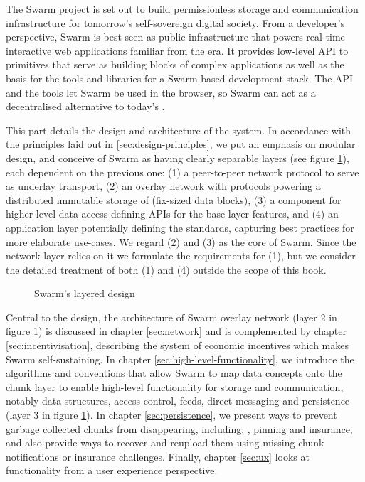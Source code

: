 
\green{}

The Swarm project is set out to build permissionless storage and communication infrastructure for tomorrow's self-sovereign digital society. From a developer's perspective, Swarm is best seen as public infrastructure that powers real-time interactive web applications familiar from the  era. It provides low-level API to primitives that serve as building blocks of complex applications as well as the basis for the tools and libraries for a Swarm-based  development stack. The API and the tools let Swarm be used in the browser, so Swarm can act as a decentralised alternative to today's .

This part details the design and architecture of the system. In accordance with the principles laid out in \ref{sec:design-principles}, we put an emphasis on modular design, and conceive of Swarm as having clearly separable layers (see figure \ref{fig:Swarm-layered-design}), each dependent on the previous one: (1) a peer-to-peer network protocol to serve as underlay transport, (2) an overlay network with protocols powering a distributed immutable storage of  (fix-sized data blocks), (3) a component for higher-level data access defining APIs for the base-layer features, and (4) an application layer potentially defining the standards, capturing best practices for more elaborate use-cases. We regard (2) and (3) as the core of Swarm. Since the network layer relies on it we formulate the requirements for (1), but we consider the detailed treatment of both (1) and (4) outside the scope of this book.


\begin{figure}[htbp]
  \centering
  \caption[Swarm's layered design]{Swarm's layered design}
  \label{fig:Swarm-layered-design}
\end{figure}

Central to the design, the architecture of Swarm overlay network (layer 2 in figure \ref{fig:Swarm-layered-design}) is discussed in chapter \ref{sec:network} and is complemented by chapter \ref{sec:incentivisation}, describing the system of economic incentives which makes Swarm self-sustaining. In chapter \ref{sec:high-level-functionality}, we introduce the algorithms and conventions that allow Swarm to map data concepts onto the chunk layer to enable high-level functionality for storage and communication, notably data structures, access control, feeds, direct messaging and persistence (layer 3 in figure \ref{fig:Swarm-layered-design}).
In chapter \ref{sec:persistence}, we present ways to prevent garbage collected chunks from disappearing, including: , pinning and insurance, and also provide ways to recover and reupload them using missing chunk notifications or insurance challenges. 
Finally, chapter \ref{sec:ux} looks at functionality from a user experience perspective.

